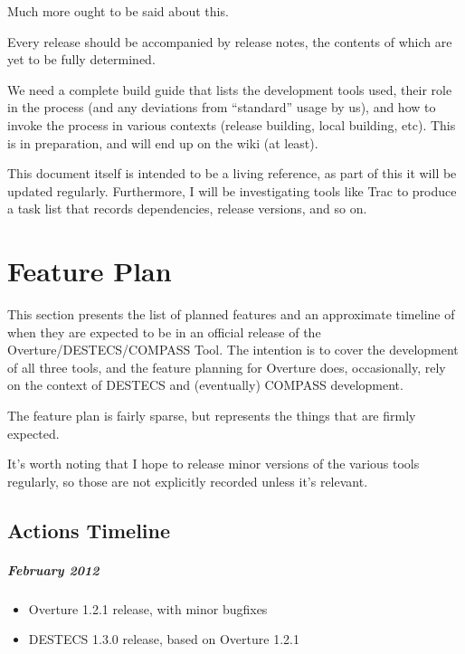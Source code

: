 \documentclass{overturerep}
\newenvironment{denseitemize}
  {\begin{itemize}\setlength{\itemsep}{0pt}\setlength{\parskip}{0pt}\setlength{\parsep}{0pt}}
  {\end{itemize}}
\newcommand{\developer}[1]{{\scriptsize \fbox{#1}}}
\begin{document}
  Much more ought to be said about this.

  Every release should be accompanied by release notes, the contents
  of which are yet to be fully determined.

  We need a complete build guide that lists the development tools
  used, their role in the process (and any deviations from
  ``standard'' usage by us), and how to invoke the process in various
  contexts (release building, local building, etc).  This is in
  preparation, and will end up on the wiki (at least).

  This document itself is intended to be a living reference, as part
  of this it will be updated regularly.  Furthermore, I will be
  investigating tools like Trac to produce a task list that records
  dependencies, release versions, and so on.




\chapter{Feature Plan}

  This section presents the list of planned features and an
  approximate timeline of when they are expected to be in an official
  release of the Overture/DESTECS/COMPASS Tool.  The intention is to
  cover the development of all three tools, and the feature planning
  for Overture does, occasionally, rely on the context of DESTECS and
  (eventually) COMPASS development.

  The feature plan is fairly sparse, but represents the things that
  are firmly expected.

  It's worth noting that I hope to release minor versions of the
  various tools regularly, so those are not explicitly recorded unless
  it's relevant.

\section{Actions Timeline}
\label{sec:actions}

\paragraph{February 2012}
\begin{denseitemize}
\item Overture 1.2.1 release, with minor bugfixes \developer{ARI, KEL}
\item DESTECS 1.3.0 release, based on Overture 1.2.1 \developer{ARI, KEL}
\end{denseitemize}
\end{document}

